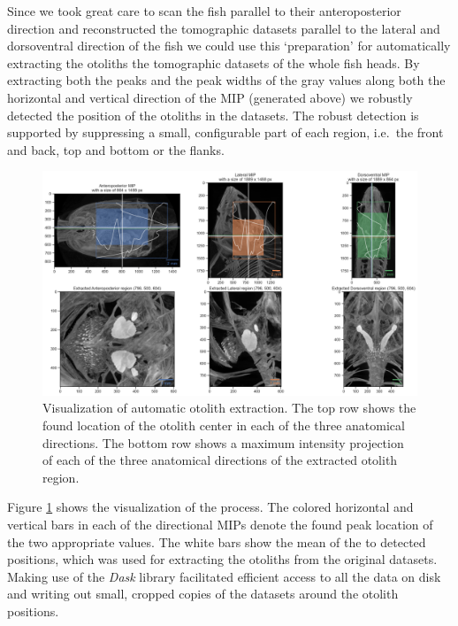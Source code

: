 Since we took great care to scan the fish parallel to their anteroposterior direction and reconstructed the tomographic datasets parallel to the lateral and dorsoventral direction of the fish we could use this `preparation' for automatically extracting the otoliths the tomographic datasets of the whole fish heads.
By extracting both the peaks and the peak widths of the gray values along both the horizontal and vertical direction of the MIP (generated above) we robustly detected the position of the otoliths in the datasets.
The robust detection is supported by suppressing a small, configurable part of each region, i.e.~the front and back, top and bottom or the flanks.

\begin{figure}
\hypertarget{fig:otolithextraction}{%
\centering
\includegraphics{images/104016.head.rec.otolither.position.png}
\caption{Visualization of automatic otolith extraction.
The top row shows the found location of the otolith center in each of the three anatomical directions.
The bottom row shows a maximum intensity projection of each of the three anatomical directions of the extracted otolith region.}\label{fig:otolithextraction}
}
\end{figure}

Figure \ref{fig:otolithextraction} shows the visualization of the process.
The colored horizontal and vertical bars in each of the directional MIPs denote the found peak location of the two appropriate values.
The white bars show the mean of the to detected positions, which was used for extracting the otoliths from the original datasets.
Making use of the \emph{Dask} library facilitated efficient access to all the data on disk and writing out small, cropped copies of the datasets around the otolith positions.

